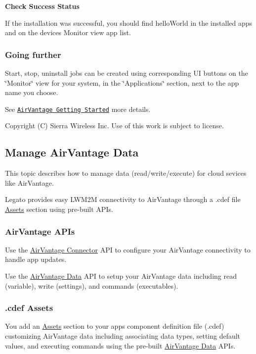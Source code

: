 {\bfseries Check Success Status}

If the installation was successful, you should find hello\+World in the installed apps and on the devices\textquotesingle{} Monitor view app list.\hypertarget{how_to_a_v_install_app_appInstallAirVantage_goingFurther}{}\subsubsection{Going further}\label{how_to_a_v_install_app_appInstallAirVantage_goingFurther}
Start, stop, uninstall jobs can be created using corresponding U\+I buttons on the \char`\"{}\+Monitor\char`\"{} view for your system, in the \char`\"{}\+Applications\char`\"{} section, next to the app name you choose.





See \href{https://doc.airvantage.net/display/USERGUIDE/Getting+Started}{\tt Air\+Vantage Getting Started} more details.





Copyright (C) Sierra Wireless Inc. Use of this work is subject to license. \hypertarget{howToAVData}{}\subsection{Manage Air\+Vantage Data}\label{howToAVData}
This topic describes how to manage data (read/write/execute) for cloud sevices like Air\+Vantage.

Legato provides easy L\+W\+M2\+M connectivity to Air\+Vantage through a .cdef file \hyperlink{def_files_cdef_defFilesCdef_assets}{Assets} section using pre-\/built A\+P\+Is.\hypertarget{how_to_a_v_data_howToAVData_APIs}{}\subsubsection{Air\+Vantage A\+P\+Is}\label{how_to_a_v_data_howToAVData_APIs}
Use the \hyperlink{c_le_avc}{Air\+Vantage Connector} A\+P\+I to configure your Air\+Vantage connectivity to handle app updates.

Use the \hyperlink{c_le_avdata}{Air\+Vantage Data} A\+P\+I to setup your Air\+Vantage data including read (variable), write (settings), and commands (executables).\hypertarget{how_to_a_v_data_howToAVData_assets}{}\subsubsection{.\+cdef Assets}\label{how_to_a_v_data_howToAVData_assets}
You add an \hyperlink{def_files_cdef_defFilesCdef_assets}{Assets}\textquotesingle{} section to your app\textquotesingle{}s component definition file ({\ttfamily }.cdef) customizing Air\+Vantage data including associating data types, setting default values, and executing commands using the pre-\/built \hyperlink{c_le_avdata}{Air\+Vantage Data} A\+P\+Is.





